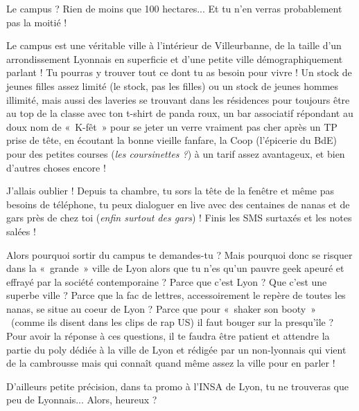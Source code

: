 Le campus ? Rien de moins que 100 hectares... Et tu n'en verras probablement pas
la moitié !

Le campus est une véritable ville à l'intérieur de Villeurbanne, de la taille
d'un arrondissement Lyonnais en superficie et d'une petite ville
démographiquement parlant ! Tu pourras y trouver tout ce dont tu as besoin pour vivre !
Un stock de jeunes filles assez limité (le stock, pas les filles) ou un stock de jeunes hommes illimité, mais
aussi des laveries se trouvant dans les résidences pour toujours être au top de
la classe avec ton t-shirt de panda roux, un bar associatif répondant au doux nom de «~K-fêt~»
pour se jeter un verre vraiment pas cher après un TP prise de tête, en écoutant
la bonne vieille fanfare, la Coop (l'épicerie du BdE) pour des petites courses
(\emph{les coursinettes ?}) à un tarif assez avantageux, et bien d'autres choses encore !

J'allais oublier ! Depuis ta chambre, tu sors la tête de la fenêtre et même pas
besoins de téléphone, tu peux dialoguer en live avec des centaines de nanas et
de gars près de chez toi (\emph{enfin surtout des gars}) ! Finis les SMS surtaxés et
les notes salées !

Alors pourquoi sortir du campus te demandes-tu ? Mais pourquoi donc se risquer
dans la «~grande~» ville de Lyon alors que tu n'es qu'un pauvre geek apeuré et effrayé par la
société contemporaine ? Parce que c'est Lyon ? Que c'est une superbe ville ?
Parce que la fac de lettres, accessoirement le repère de toutes les nanas, se
situe au coeur de Lyon ? Parce que pour «~shaker son booty~» ~(comme ils disent dans
les clips de rap US) il faut bouger sur la presqu'île ? Pour avoir la réponse à
ces questions, il te faudra être patient et attendre la partie du poly dédiée à la ville
de Lyon et rédigée par un non-lyonnais qui vient de la cambrousse mais
qui connaît quand même assez la ville pour en parler !

D'ailleurs petite précision, dans ta promo à l'INSA de Lyon, tu ne trouveras
que peu de Lyonnais... Alors, heureux ?
